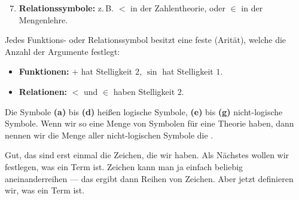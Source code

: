 \begin{math-stroke}
\begin{enumerate}[label=\textbf{(\alph*)}]
    \setcounter{enumi}{6}
    \item \textbf{Relationssymbole:} z.\,B. $<$ in der Zahlentheorie, oder $\in$ in der Mengenlehre.
\end{enumerate}

\begin{explanation-of-steps}
Jedes Funktions- oder Relationssymbol besitzt eine feste  (Arität), welche die Anzahl der Argumente festlegt:
\begin{itemize}
    \item \textbf{Funktionen:} $+$ hat Stelligkeit $2$, $\sin$ hat Stelligkeit $1$.
    \item \textbf{Relationen:} $<$ und $\in$ haben Stelligkeit $2$.
\end{itemize}
\end{explanation-of-steps}
\end{math-stroke}

\begin{spoken-clean}[00:40:30 - 00:41:45]
Die Symbole \textbf{(a)} bis \textbf{(d)} heißen logische Symbole, \textbf{(e)} bis \textbf{(g)} nicht-logische Symbole. Wenn wir so eine Menge von Symbolen für eine Theorie haben, dann nennen wir die Menge aller nicht-logischen Symbole die . 

Gut, das sind erst einmal die Zeichen, die wir haben. Als Nächstes wollen wir festlegen, was ein Term ist. Zeichen kann man ja einfach beliebig aneinanderreihen --- das ergibt dann Reihen von Zeichen. Aber jetzt definieren wir, was ein Term ist.
\end{spoken-clean}

